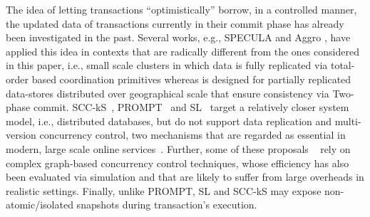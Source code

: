The idea of letting transactions ``optimistically'' borrow, in a controlled manner, the updated data of transactions currently in their commit phase has already been investigated in the past. Several works, e.g., SPECULA \cite{peluso2012specula} and Aggro \cite{palmieri2010aggro}, have applied this idea in contexts that are radically different from the ones considered in this paper, i.e., small scale clusters in which data is fully replicated via total-order based coordination primitives whereas \specula is designed for partially replicated data-stores distributed over geographical scale that ensure consistency via Two-phase commit.  SCC-kS~\cite{bestavros1996value}, PROMPT~\cite{PROMPT} and SL~\cite{Reddy} target a relatively closer system model, i.e., distributed databases, but do not support data replication and multi-version concurrency control, two mechanisms that are regarded as essential in modern, large scale online services~\cite{spanner,megastore,score}. Further, some of these proposals ~\cite{bestavros1996value, Romano-2014} rely on complex graph-based concurrency control techniques, whose efficiency has also been evaluated via simulation and that are likely to suffer from large overheads in realistic settings. Finally, unlike \specula PROMPT, SL and SCC-kS may expose non-atomic/isolated snapshots during transaction's execution.








